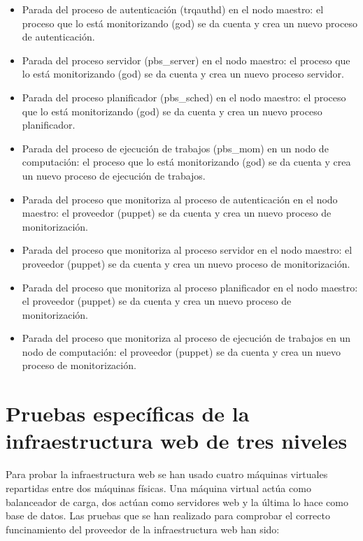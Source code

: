 \begin{itemize}
\item Parada del proceso de autenticación (trqauthd) en el nodo maestro: el proceso que lo está monitorizando (god) se da cuenta y crea un nuevo proceso de autenticación.
\item Parada del proceso servidor (pbs\_server) en el nodo maestro: el proceso que lo está monitorizando (god) se da cuenta y crea un nuevo proceso servidor.
\item Parada del proceso planificador (pbs\_sched) en el nodo maestro: el proceso que lo está monitorizando (god) se da cuenta y crea un nuevo proceso planificador.
\item Parada del proceso de ejecución de trabajos (pbs\_mom) en un nodo de computación: el proceso que lo está monitorizando (god) se da cuenta y crea un nuevo proceso de ejecución de trabajos.
\item Parada del proceso que monitoriza al proceso de autenticación en el nodo maestro: el proveedor (puppet) se da cuenta y crea un nuevo proceso de monitorización.
\item Parada del proceso que monitoriza al proceso servidor en el nodo maestro: el proveedor (puppet) se da cuenta y crea un nuevo proceso de monitorización.
\item Parada del proceso que monitoriza al proceso planificador en el nodo maestro: el proveedor (puppet) se da cuenta y crea un nuevo proceso de monitorización.
\item Parada del proceso que monitoriza al proceso de ejecución de trabajos en un nodo de computación: el proveedor (puppet) se da cuenta y crea un nuevo proceso de monitorización.
\end{itemize}


\section{Pruebas específicas de la infraestructura web de tres niveles}

Para probar la infraestructura web se han usado cuatro máquinas virtuales repartidas entre dos máquinas físicas. Una máquina virtual actúa como balanceador de carga, dos actúan como servidores web y la última lo hace como base de datos. Las pruebas que se han realizado para comprobar el correcto funcinamiento del proveedor de la infraestructura web han sido:

